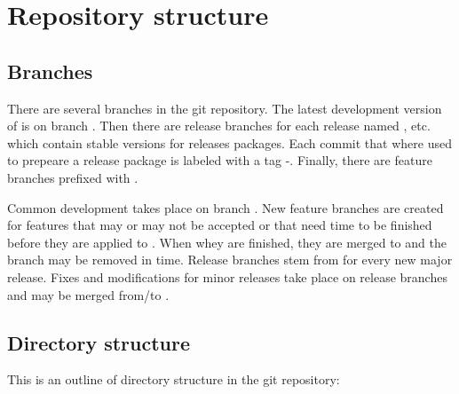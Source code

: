 \section{Repository structure}
\subsection{Branches}
There are several branches in the git repository. The latest development version of is on branch . Then there are release branches for each release named ,  etc. which contain stable versions for  releases  packages. Each commit that where used to prepeare a release package is labeled with a tag -. Finally, there are feature branches prefixed with .

Common development takes place on branch . New feature branches are created for features that may or may not be accepted or that need time to be finished before they are applied to . When whey are finished, they are merged to  and the branch may be removed in time. Release branches stem from  for every new major release. Fixes and modifications for minor releases take place on release branches and may be merged from/to .

\subsection{Directory structure}
This is an outline of directory structure in the git repository:

